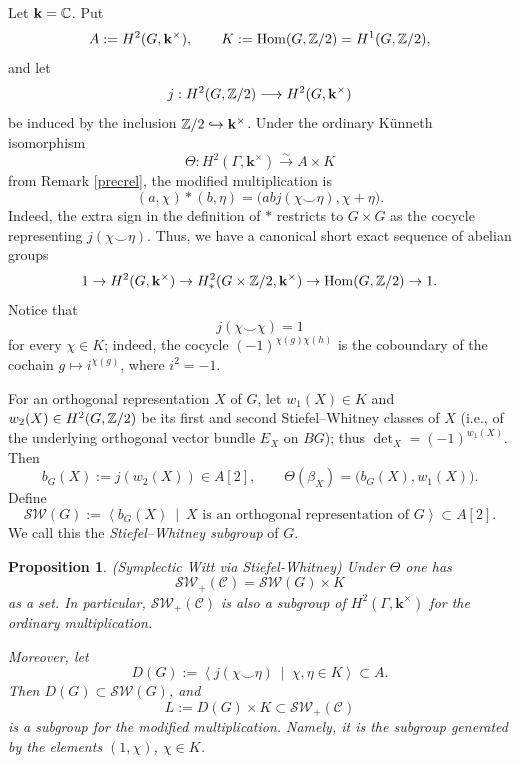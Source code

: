 \documentclass[12pt]{amsart}
\numberwithin{equation}{section}
\providecommand{\k}{}\renewcommand{\k}{\mathbf{k}}
\providecommand{\C}{}\renewcommand{\C}{\mathcal{C}}
\providecommand{\Hom}{}\renewcommand{\Hom}{\operatorname{Hom}}
\theoremstyle{plain}
\newtheorem{proposition}[theorem]{Proposition}
\theoremstyle{definition}
\theoremstyle{remark}
\begin{document}
Let $\k=\Bbb C$. Put
\[
A:=H^2(G,\k^\times),\qquad K:=\Hom(G,\Bbb Z/2)=H^1(G,\Bbb Z/2),
\]
and let
\[
j:H^2(G,\Bbb Z/2)\longrightarrow H^2(G,\k^\times)
\]
be induced by the inclusion $\Bbb Z/2\hookrightarrow\k^\times$. Under the ordinary K\"unneth isomorphism
\[
\Theta:H^2(\Gamma,\k^\times)\xrightarrow{\sim}A\times K
\]
from Remark \ref{precrel}, the modified multiplication is
\begin{equation}\label{modifiedKunneth}
(a,\chi)*(b,\eta)=\bigl(abj(\chi\smile\eta),\chi+\eta\bigr).
\end{equation}
Indeed, the extra sign in the definition of $*$ restricts to $G\times G$ as the cocycle representing $j(\chi\smile\eta)$. 
Thus, we have a canonical short exact sequence of abelian groups 
$$
1\to H^2(G,\k^\times)\to H^2_*(G\times \Bbb Z/2,\k^\times)\to \Hom(G,\Bbb Z/2)\to 1.
$$
Notice that
\begin{equation}\label{cupsquarezero}
j(\chi\smile\chi)=1
\end{equation}
for every $\chi\in K$; indeed, the cocycle $(-1)^{\chi(g)\chi(h)}$ is the coboundary of the cochain $g\mapsto i^{\chi(g)}$, where $i^2=-1$.

For an orthogonal representation $X$ of $G$, let $w_1(X)\in K$ and $w_2(X)\in H^2(G,\Bbb Z/2)$ be its first and second Stiefel--Whitney classes of $X$ (i.e., of the underlying orthogonal vector bundle $E_X$ on $BG$); thus $\det_X=(-1)^{w_1(X)}$. Then
\[
b_G(X):=j(w_2(X))\in A[2],
\qquad
\Theta(\beta_X)=\bigl(b_G(X),w_1(X)\bigr).
\]
Define
\[
{\mathcal S\mathcal W}(G):=
\left\langle b_G(X)\ \middle|\ X\text{ is an orthogonal representation of }G\right\rangle
\subset A[2].
\]
We call this the \emph{Stiefel--Whitney subgroup} of $G$.

\begin{proposition}\label{SWproductstructure} (Symplectic Witt via Stiefel-Whitney)
Under $\Theta$ one has
\[
\mathcal S\mathcal W_+(\C)={\mathcal S\mathcal W}(G)\times K
\]
as a set. In particular, $\mathcal S\mathcal W_+(\C)$ is also a subgroup of $H^2(\Gamma,\k^\times)$ for the ordinary multiplication.

Moreover, let
\[
D(G):=
\left\langle j(\chi\smile\eta)\ \middle|\ \chi,\eta\in K\right\rangle
\subset A.
\]
Then $D(G)\subset {\mathcal S\mathcal W}(G)$, and
\[
L:=D(G)\times K\subset \mathcal S\mathcal W_+(\C)
\]
is a subgroup for the modified multiplication. Namely, it is the subgroup generated by the elements $(1,\chi)$, $\chi\in K$. 
\end{proposition}
\end{document}
